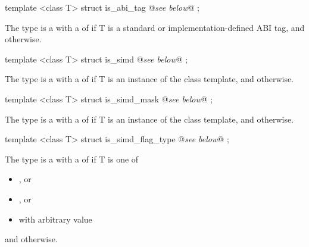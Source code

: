\begin{itemdecl}
template <class T> struct is_abi_tag { @\emph{see below}@ };
\end{itemdecl}
\begin{itemdescr}
  \pnum The type  is a \UnaryTypeTrait with a \BaseCharacteristic of  if \type T is a standard or implementation-defined ABI tag, and  otherwise.
\end{itemdescr}

\begin{itemdecl}
template <class T> struct is_simd { @\emph{see below}@ };
\end{itemdecl}
\begin{itemdescr}
  \pnum The type  is a \UnaryTypeTrait with a \BaseCharacteristic of  if \type T is an instance of the \simd class template, and  otherwise.
\end{itemdescr}

\begin{itemdecl}
template <class T> struct is_simd_mask { @\emph{see below}@ };
\end{itemdecl}
\begin{itemdescr}
  \pnum The type  is a \UnaryTypeTrait with a \BaseCharacteristic of  if \type T is an instance of the \mask class template, and  otherwise.
\end{itemdescr}

\begin{itemdecl}
template <class T> struct is_simd_flag_type { @\emph{see below}@ };
\end{itemdecl}
\begin{itemdescr}
  \pnum The type  is a \UnaryTypeTrait with a \BaseCharacteristic of  if \type T is one of
  \begin{itemize}
    \item {}, or
    \item {}, or
    \item {} with arbitrary value 
  \end{itemize}
  and  otherwise.
\end{itemdescr}

